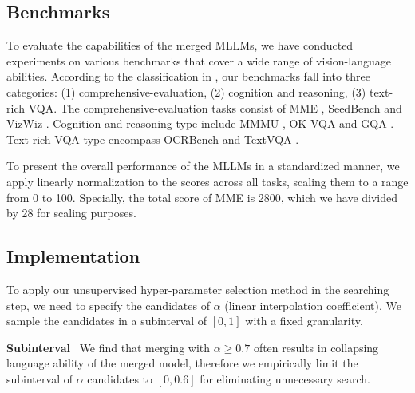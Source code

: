 \subsection{Benchmarks}
To evaluate the capabilities of the merged MLLMs, we have conducted experiments on various benchmarks that cover a wide range of vision-language abilities. According to the classification in \cite{survey_benchmark}, our benchmarks fall into three categories: (1) comprehensive-evaluation, (2) cognition and reasoning, (3) text-rich VQA. 
The comprehensive-evaluation tasks consist of MME \cite{mme}, SeedBench \cite{seedbench} and VizWiz \cite{vizwiz}. Cognition and reasoning type include MMMU \cite{mmmu}, OK-VQA \cite{okvqa} and GQA \cite{gqa}. Text-rich VQA type encompass  OCRBench \cite{ocrbench} and TextVQA \cite{textvqa}.

To present the overall performance of the MLLMs in a standardized manner, we apply linearly normalization to the scores across all tasks, scaling them to a range from 0 to 100. Specially, the total score of MME is 2800, which we have divided by 28 for scaling purposes.


\subsection{Implementation} \label{impl}

To apply our unsupervised hyper-parameter selection method in the searching step, we need to specify the candidates of $\alpha$ (linear interpolation coefficient). We sample the candidates in a subinterval of $[0,1]$ with a fixed granularity.

\noindent\textbf{Subinterval} \ We find that merging with $\alpha\geq0.7$ often results in collapsing language ability of the merged model, therefore we empirically limit the subinterval of $\alpha$ candidates to $[0,0.6]$ for eliminating unnecessary search.


